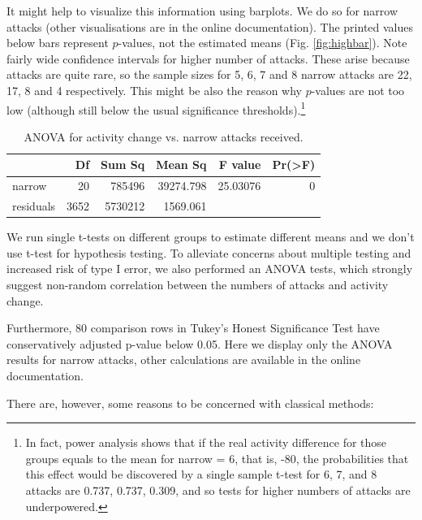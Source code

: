 \documentclass[a4paper,fleqn]{cas-dc}
\begin{document}
It might help to visualize this information using barplots. We do so for
narrow attacks (other visualisations are in the online documentation).
The printed values below bars represent \(p\)-values, not the estimated
means (Fig. \ref{fig:highbar}). Note fairly wide confidence intervals
for higher number of attacks. These arise because attacks are quite
rare, so the sample sizes for 5, 6, 7 and 8 narrow attacks are 22, 17, 8
and 4 respectively. This might be also the reason why \(p\)-values are
not too low (although still below the usual significance
thresholds).\footnote{In fact, power analysis shows that if the real activity difference for those groups equals to the mean for \textsf{narrow = 6}, that is, -80, the probabilities that this effect would be discovered by a single sample t-test for 6, 7, and 8 attacks are 0.737, 0.737, 0.309, and so tests for higher numbers of attacks are underpowered.}

\begin{table}[H]\footnotesize
\begin{tabular}{l|r|r|r|r|r}
\hline
  & Df & Sum Sq & Mean Sq & F value & Pr(>F)\\
\hline
narrow & 20 & 785496 & 39274.798 & 25.03076 & 0\\
\hline
residuals & 3652 & 5730212 & 1569.061 &  & \\
\hline
\end{tabular}

\caption{ANOVA for activity change vs. narrow  attacks received.}
\label{tab:anovanarrow}
\end{table}
\normalsize

We run single t-tests on different groups to estimate different means
and we don't use t-test for hypothesis testing. To alleviate concerns
about multiple testing and increased risk of type I error, we also
performed an ANOVA tests, which strongly suggest non-random correlation
between the numbers of attacks and activity change.

Furthermore, 80 comparison rows in Tukey's Honest Significance Test
\citep{Tukey1949} have conservatively adjusted p-value below 0.05. Here we
display only the ANOVA results for narrow attacks, other calculations
are available in the online documentation.

There are, however, some reasons to be concerned with classical methods:
\end{document}
